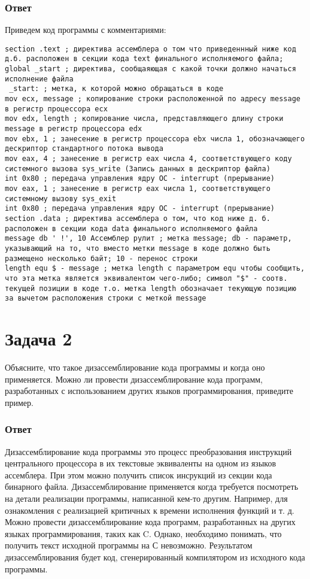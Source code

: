 \documentclass[12pt]{article}
\begin{document}
\subsubsection*{Ответ}
Приведем код программы с комментариями:
\begin{verbatim}
section .text ; директива ассемблера о том что приведеннный ниже код д.б. расположен в секции кода text финального исполняемого файла;
global _start ; директива, сообщаяющая с какой точки должно начаться исполнение файла
 _start: ; метка, к которой можно обращаться в коде
mov ecx, message ; копирование строки расположенной по адресу message в регистр процессора ecx
mov edx, length ; копирование числа, представляющего длину строки message в регистр процессора edx
mov ebx, 1 ; занесение в регистр процессора ebx числа 1, обозначающего дескриптор стандартного потока вывода
mov eax, 4 ; занесение в регистр eax числа 4, соответствующего коду системного вызова sys_write (Запись данных в дескриптор файла)
int 0x80 ; передача управления ядру ОС - interrupt (прерывание)
mov eax, 1 ; занесение в регистр eax числа 1, соответствующего системному вызову sys_exit
int 0x80 ; передача управления ядру ОС - interrupt (прерывание)
section .data ; директива ассемблера о том, что код ниже д. б. расположен в секции кода data финального исполняемого файла
message db ' !', 10 Ассемблер рулит ; метка message; db - параметр, указывающий на то, что вместо метки message в коде должно быть размещено несколько байт; 10 - перенос строки
length equ $ - message ; метка length c параметром equ чтобы сообщить, что эта метка является эквивалентом чего-либо; символ "$" - соотв. текущей позиции в коде т.о. метка length обозначает текующую позицию за вычетом расположения строки с меткой message
\end{verbatim}
\section*{Задача 2}
Объясните, что такое дизассемблирование кода программы и когда оно применяется.
Можно ли провести дизассемблирование кода программ, разработанных с использованием
других языков программирования, приведите пример. 
\subsubsection*{Ответ}
Дизассемблирование кода программы это процесс преобразования инструкций центрального
процессора в их текстовые эквиваленты на одном из языков ассемблера. При этом можно
получить список инсрукций из секции кода бинарного файла. Дизассемблирование применяется
когда требуется посмотреть на детали реализации программы, написанной кем-то другим.
Например, для ознакомления с реализацией критичных к времени исполнения функций и т. д.
Можно провести дизассемблирование кода программ, разработанных на других языках
программирования, таких как C. Однако, необходимо понимать, что получить текст исходной
программы на С невозможно. Результатом дизассемблирования будет код, сгенерированный
компилятором из исходного кода программы.
\end{document}
